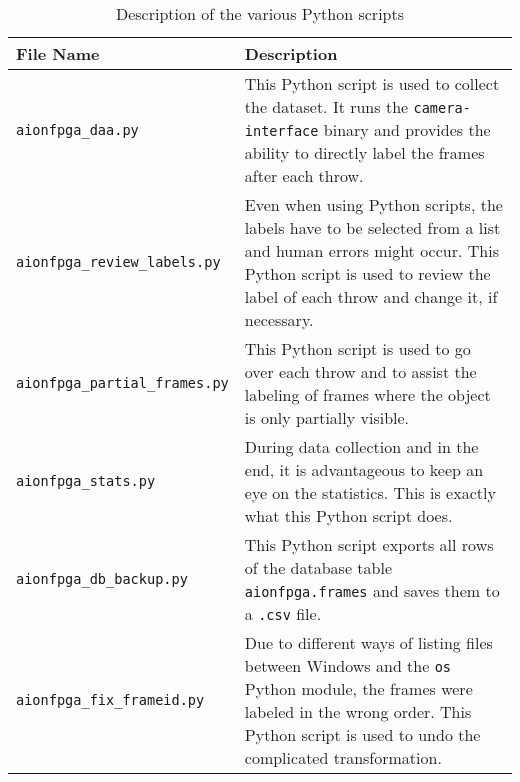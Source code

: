 \begin{table}[hb]
  \caption{Description of the various Python scripts}
  \label{tab:python_scripts}
  \centering
  \begin{tabular}{lp{9cm}}
    \toprule
    \textbf{File Name} & \textbf{Description} \\
    \midrule
    \texttt{aionfpga\_daa.py} & This Python script is used to collect the dataset. It runs the \texttt{camera-interface} binary and provides the ability to directly label the frames after each throw. \\
    \midrule
    \texttt{aionfpga\_review\_labels.py} & Even when using Python scripts, the labels have to be selected from a list and human errors might occur. This Python script is used to review the label of each throw and change it, if necessary. \\
    \midrule
    \texttt{aionfpga\_partial\_frames.py} & This Python script is used to go over each throw and to assist the labeling of frames where the object is only partially visible. \\
    \midrule
    \texttt{aionfpga\_stats.py} & During data collection and in the end, it is advantageous to keep an eye on the statistics. This is exactly what this Python script does. \\
    \midrule
    \texttt{aionfpga\_db\_backup.py} & This Python script exports all rows of the database table \texttt{aionfpga.frames} and saves them to a \texttt{.csv} file. \\
    \midrule
    \texttt{aionfpga\_fix\_frameid.py} & Due to different ways of listing files between Windows and the \texttt{os} Python module, the frames were labeled in the wrong order. This Python script is used to undo the complicated transformation. \\
    \bottomrule
  \end{tabular}
\end{table}

